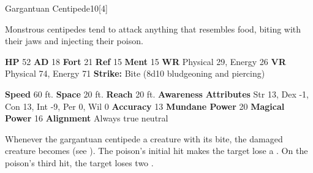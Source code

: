   
  \begin{monsection}{Gargantuan Centipede}{10}[4]
    \vspace{-1em}\vspace{-1em}
    \vspace{0em}

    
    Monstrous centipedes tend to attack anything that resembles food, biting with their jaws and injecting their poison.
  
    

    \begin{spellcontent}
      \begin{spelltargetinginfo}
        \pari \textbf{HP} 52 \monsep
          \textbf{AD} 18 \monsep
          \textbf{Fort} 21 \monsep
          \textbf{Ref} 15 \monsep
          \textbf{Ment} 15
        \pari \textbf{WR} Physical 29, Energy 26 \monsep
        \textbf{VR} Physical 74, Energy 71
        \pari \textbf{Strike:}
            Bite  (8d10 bludgeoning and piercing)
      \end{spelltargetinginfo}
    \end{spellcontent}
    \begin{monsterfooter}
      \pari \textbf{Speed} 60 ft. \monsep
        \textbf{Space} 20 ft. \monsep
        \textbf{Reach} 20 ft.
      \pari \textbf{Awareness} 
      \pari \textbf{Attributes}
        Str 13, Dex -1,
        Con 13, Int -9,
        Per 0, Wil 0
      \pari \textbf{Accuracy} 13 \monsep
        \textbf{Mundane Power} 20 \monsep
      \textbf{Magical Power} 16
      \pari \textbf{Alignment} Always true neutral
    \end{monsterfooter}
  \end{monsection}
        Whenever the gargantuan centipede  a creature with its bite,
          the damaged creature becomes  (see ).
        The poison's initial hit makes the target lose a .
        On the poison's third hit, the target loses two .
  
